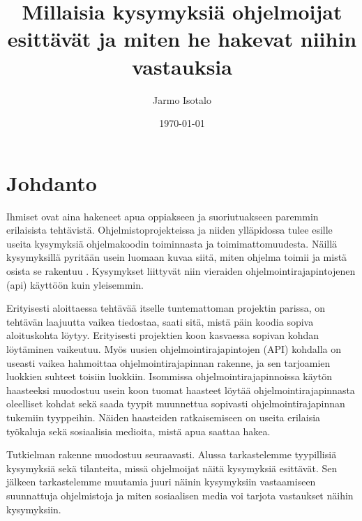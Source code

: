 \documentclass[finnish]{../tktltiki2}
\title{Millaisia kysymyksiä ohjelmoijat esittävät ja miten he hakevat niihin vastauksia}
\author{Jarmo Isotalo}
\date{\today}
\theoremstyle{definition}
\theoremstyle{remark}
\begin{document}

\frontmatter      %

\maketitle        %

\tableofcontents  %


\mainmatter       %

\section{Johdanto}
Ihmiset ovat aina hakeneet apua oppiakseen ja suoriutuakseen paremmin erilaisista tehtävistä. %
Ohjelmistoprojekteissa ja niiden ylläpidossa tulee esille useita kysymyksiä ohjelmakoodin toiminnasta ja toimimattomuudesta. Näillä kysymyksillä pyritään usein luomaan kuvaa siitä, miten ohjelma toimii ja  mistä osista se rakentuu \cite{g_search_code, questions-during-software-evolution-tasks,asking-and-answering-api-questions}.
Kysymykset liittyvät niin vieraiden ohjelmointirajapintojenen (api) käyttöön \cite{jungloid-mining} kuin yleisemmin.

Erityisesti aloittaessa tehtävää itselle tuntemattoman projektin parissa, on tehtävän laajuutta vaikea tiedostaa, saati sitä, mistä päin koodia sopiva aloituskohta löytyy. Erityisesti projektien koon kasvaessa sopivan kohdan löytäminen vaikeutuu.
Myös uusien ohjelmointirajapintojen (API) kohdalla on useasti vaikea hahmoittaa ohjelmointirajapinnan rakenne, ja sen tarjoamien luokkien suhteet toisiin luokkiin. Isommissa ohjelmointirajapinnoissa käytön haasteeksi muodostuu usein koon tuomat haasteet löytää ohjelmointirajapinnasta oleelliset kohdat sekä saada tyypit muunnettua sopivasti ohjelmointirajapinnan tukemiin tyyppeihin.
Näiden haasteiden ratkaisemiseen on useita erilaisia työkaluja sekä sosiaalisia medioita, mistä apua saattaa hakea.

Tutkielman rakenne muodostuu seuraavasti. Alussa tarkastelemme tyypillisiä kysymyksiä sekä tilanteita, missä ohjelmoijat näitä kysymyksiä esittävät. Sen jälkeen tarkastelemme muutamia juuri näinin kysymyksiin vastaamiseen suunnattuja ohjelmistoja ja miten sosiaalisen media voi tarjota vastaukset näihin kysymyksiin.
\end{document}
